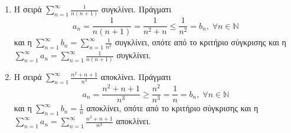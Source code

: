 \documentclass[main.tex]{subfiles}
\begin{document}
\begin{examples}
\item {}
    \begin{enumerate}
        \item Η σειρά $ \sum_{n=1}^{\infty} \frac{1}{n(n+1)} $ συγκλίνει. Πράγματι
            \[
                a_{n}= \frac{1}{n(n+1)} = \frac{1}{n^{2}+n} \leq \frac{1}{n^{2}} = 
                b_{n}, \; \forall n \in \mathbb{N}
            \] 
            και η $ \sum_{n=1}^{\infty} b_{n} = \sum_{n=1}^{\infty} \frac{1}{n^{2}} $ 
            συγκλίνει, οπότε από το κριτήριο 
            σύγκρισης και η $ \sum_{n=1}^{\infty} a_{n} = \sum_{n=1}^{\infty} 
            \frac{1}{n(n+1)} $ συγκλίνει. 

        \item Η σειρά $ \sum_{n=1}^{\infty} \frac{n^{2}+n+1}{n^{3}} $ αποκλίνει. Πράγματι
            \[
                a_{n} = \frac{n^{2}+n+1}{n^{3}} \geq \frac{n^{2}}{n^{3}} = \frac{1}{n} = 
                b_{n}, \; \forall n \in \mathbb{N} 
            \] 
            και η $ \sum_{n=1}^{\infty} b_{n} = \frac{1}{n} $ αποκλίνει, οπότε από 
            το κριτήριο σύγκρισης και η $ \sum_{n=1}^{\infty} a_{n} = 
            \sum_{n=1}^{\infty} \frac{n^{2}+n+1}{n^{3}} $ αποκλίνει.
    \end{enumerate}
\end{examples}
\end{document}
